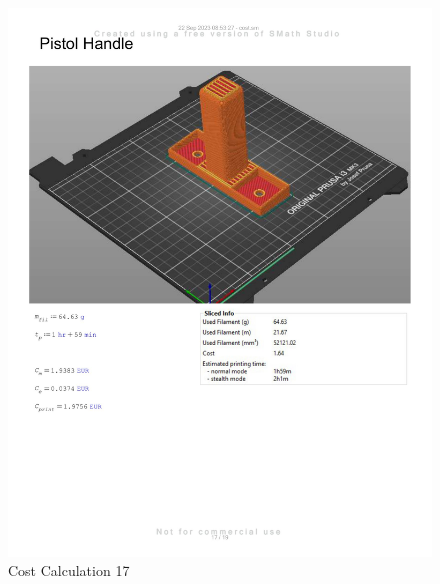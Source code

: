 \begin{figure}[H]
    \centering
    \includegraphics[width=\linewidth]{texs/appendix/data/costcalculation/cost1-17.jpg}
    \caption{Cost Calculation 17}
    \label{fig:cost-calculation-17}
\end{figure}


